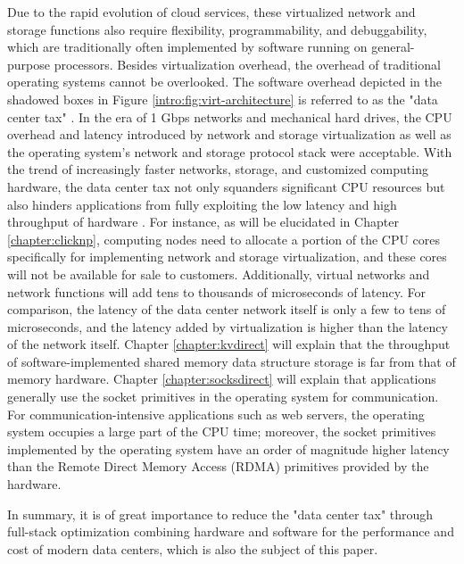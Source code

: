 Due to the rapid evolution of cloud services, these virtualized network and storage functions also require flexibility, programmability, and debuggability, which are traditionally often implemented by software running on general-purpose processors. Besides virtualization overhead, the overhead of traditional operating systems cannot be overlooked. The software overhead depicted in the shadowed boxes in Figure \ref{intro:fig:virt-architecture} is referred to as the "data center tax" \cite{barroso2009datacenter,barroso2013datacenter,barroso2018datacenter}.
In the era of 1 Gbps networks and mechanical hard drives, the CPU overhead and latency introduced by network and storage virtualization as well as the operating system's network and storage protocol stack were acceptable.
With the trend of increasingly faster networks, storage, and customized computing hardware, the data center tax not only squanders significant CPU resources but also hinders applications from fully exploiting the low latency and high throughput of hardware \cite{barroso2017attack}.
For instance, as will be elucidated in Chapter \ref{chapter:clicknp}, computing nodes need to allocate a portion of the CPU cores specifically for implementing network and storage virtualization, and these cores will not be available for sale to customers.
Additionally, virtual networks and network functions will add tens to thousands of microseconds of latency. For comparison, the latency of the data center network itself is only a few to tens of microseconds, and the latency added by virtualization is higher than the latency of the network itself.
Chapter \ref{chapter:kvdirect} will explain that the throughput of software-implemented shared memory data structure storage is far from that of memory hardware.
Chapter \ref{chapter:socksdirect} will explain that applications generally use the socket primitives in the operating system for communication. For communication-intensive applications such as web servers, the operating system occupies a large part of the CPU time; moreover, the socket primitives implemented by the operating system have an order of magnitude higher latency than the Remote Direct Memory Access (RDMA) primitives provided by the hardware.

In summary, it is of great importance to reduce the "data center tax" through full-stack optimization combining hardware and software for the performance and cost of modern data centers, which is also the subject of this paper.

